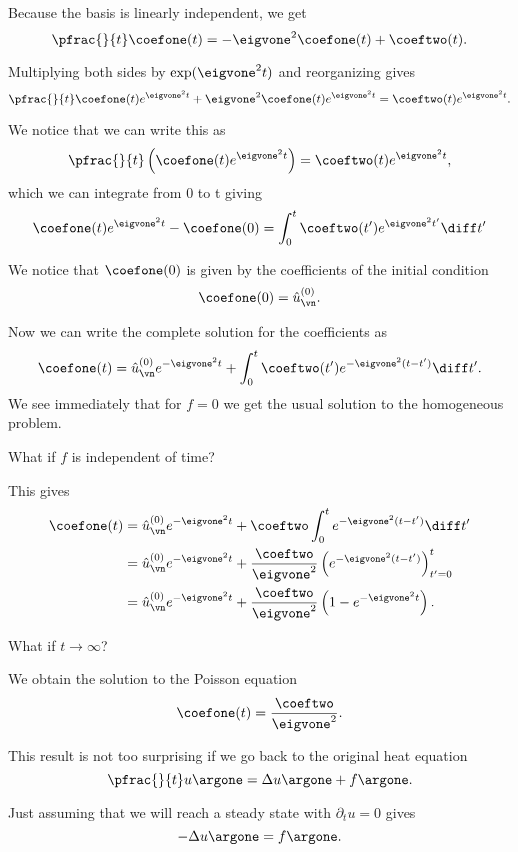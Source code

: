 \begin{frame}
	Because the basis is linearly independent, we get 
	\[\pfrac{}{t} \coefone (t) = -\eigvone^2 \coefone(t) + \coeftwo (t). \]
	
	\pause
	Multiplying both sides by $ \exp(\eigvone^2 t ) $ and reorganizing gives
	\[\pfrac{}{t} \coefone (t) e^{\eigvone^2 t} + \eigvone^2 \coefone(t)e^{\eigvone^2 t} =  \coeftwo (t)e^{\eigvone^2 t}. \]
	
	\pause
	We notice that we can write this as 
	\[ \pfrac{}{t} \left( \coefone(t) e^{\eigvone^2 t} \right) = \coeftwo(t) e^{\eigvone^2 t}, \]
	which we can integrate from 0 to t giving 
	\[  \coefone(t) e^{\eigvone^2 t} - \coefone(0) = \int_{0}^{t}\coeftwo(t') e^{\eigvone^2 t'} \diff t'  \]
\end{frame}

\begin{frame}
	We notice that $ \coefone (0) $ is given by the coefficients of the initial condition 
	\[ \coefone (0) = \hat{u}^{(0)}_{\vn}. \]
	
	\pause
	Now we can write the complete solution for the coefficients as 
	\[ \coefone (t) = \hat{u}^{(0)}_{\vn} e^{-\eigvone^2 t} + \int_{0}^{t}\coeftwo(t') e^{-\eigvone^2 (t-t')} \diff t'.  \]
	We see immediately that for $ f=0 $ we get the usual solution to the homogeneous problem.
	
	\pause
	What if $ f $ is independent of time?
\end{frame}

\begin{frame}
	This gives
	\[ 
	\begin{split}
	\coefone (t) &= \hat{u}^{(0)}_{\vn} e^{-\eigvone^2 t} + \coeftwo \int_{0}^{t} e^{-\eigvone^2 (t-t')} \diff t' \\
	& =   \hat{u}^{(0)}_{\vn} e^{-\eigvone^2 t} + \frac{\coeftwo}{\eigvone^2} 
	\left( e^{-\eigvone^2 (t-t')} \right)_{t'=0}^{t} \\
	& = \hat{u}^{(0)}_{\vn} e^{-\eigvone^2 t} + \frac{\coeftwo}{\eigvone^2} 
	\left( 1 - e^{-\eigvone^2 t} \right).
	\end{split}
	\]
	
	\pause
	What if $ t \to \infty $?
	
	\pause
	We obtain the solution to the Poisson equation
	\[ \coefone (t) = \frac{\coeftwo}{\eigvone^2}. \]
\end{frame}

\begin{frame}
	This result is not too surprising if we go back to the original heat equation
	\[ \pfrac{}{t} u\argone = \Delta u\argone + f\argone. \]
	
	\pause
	Just assuming that we will reach a \alert{steady state} with $ \partial_t u = 0 $ gives 
	\[  
	-\Delta u\argone = f\argone.
	\]
\end{frame}

